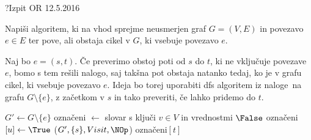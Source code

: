 \begin{naloga}{?}{Izpit OR 12.5.2016}
\begin{vprasanje}
Napiši algoritem,
ki na vhod sprejme neusmerjen graf $G = (V, E)$ in povezavo $e \in E$
ter pove, ali obstaja cikel v $G$, ki vsebuje povezavo $e$.
\end{vprasanje}

\begin{odgovor}
Naj bo $e = (s, t)$. 
Če preverimo obstoj poti od $s$ do $t$, ki ne vključuje povezave $e$, 
bomo s tem rešili nalogo, saj takšna pot obstaja natanko tedaj, 
ko je v grafu cikel, ki vsebuje povezavo $e$.
Ideja bo torej uporabiti {\sc dfs} algoritem iz naloge~\nal[Dfs]
na grafu $G \setminus \{e\}$, z začetkom v $s$
in tako preveriti, če lahko pridemo do $t$.
\begin{small}
\begin{algorithmic}
	\State $G' \gets G \setminus \{e\}$
	\State označeni $\gets$ slovar s ključi $v \in V$ in vrednostmi $\False$
		\State označeni$[u] \gets \True$
	\EndFunction
	($G', \{s\}, {\sc Visit}, \NOp$)
	\State \Return označeni$[t]$
\EndFunction
\end{algorithmic}
\end{small}
\end{odgovor}
\end{naloga}
